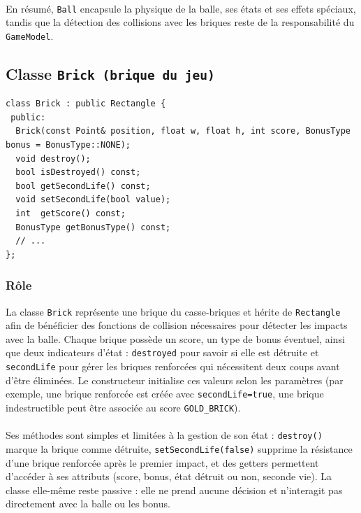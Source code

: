 \documentclass[12pt]{article}
\begin{document}
\paragraph{}
En résumé, \colorbox{gray!20}{\texttt{Ball}} encapsule la physique de la balle, ses états et ses effets spéciaux, tandis que la détection des collisions avec les briques reste de la responsabilité du \colorbox{gray!20}{\texttt{GameModel}}.





\newpage
\subsection{Classe \texttt{Brick (brique du jeu)}}

\begin{lstlisting}
class Brick : public Rectangle {
 public:
  Brick(const Point& position, float w, float h, int score, BonusType bonus = BonusType::NONE);
  void destroy();
  bool isDestroyed() const;
  bool getSecondLife() const;
  void setSecondLife(bool value);
  int  getScore() const;
  BonusType getBonusType() const;
  // ...
};

\end{lstlisting}

\subsubsection* {Rôle}
La classe \colorbox{gray!20}{\texttt{Brick}} représente une brique du casse-briques et hérite de \colorbox{gray!20}{\texttt{Rectangle}} afin de bénéficier des fonctions de collision nécessaires pour détecter les impacts avec la balle. Chaque brique possède un score, un type de bonus éventuel, ainsi que deux indicateurs d’état : \colorbox{gray!20}{\texttt{destroyed}} pour savoir si elle est détruite et \colorbox{gray!20}{\texttt{secondLife}} pour gérer les briques renforcées qui nécessitent deux coups avant d’être éliminées. Le constructeur initialise ces valeurs selon les paramètres (par exemple, une brique renforcée est créée avec \colorbox{gray!20}{\texttt{secondLife=true}}, une brique indestructible peut être associée au score \colorbox{gray!20}{\texttt{GOLD\_BRICK}}). 

\paragraph{}
Ses méthodes sont simples et limitées à la gestion de son état : \colorbox{gray!20}{\texttt{destroy()}} marque la brique comme détruite, \colorbox{gray!20}{\texttt{setSecondLife(false)}} supprime la résistance d’une brique renforcée après le premier impact, et des getters permettent d’accéder à ses attributs (score, bonus, état détruit ou non, seconde vie). La classe elle-même reste passive : elle ne prend aucune décision et n’interagit pas directement avec la balle ou les bonus.
\end{document}
